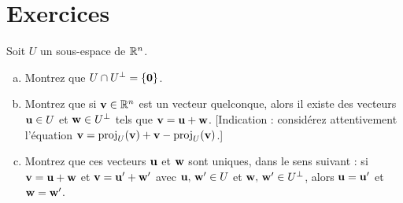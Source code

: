 \section*{Exercices}
 

\begin{prob} \label{prob20.1} Soit $U$ un sous-espace de $\mathbb{R}^n$.
\medskip

\begin{enumerate}[a)]
\item  Montrez que $U \cap U^\perp = \{\mathbf{0}\}$.
\medskip
 
\item  Montrez que si $\mathbf{v}\in \mathbb{R}^n$ est un vecteur quelconque, alors il existe des vecteurs $\mathbf{u}\in U$ et $\mathbf{w}\in U^\perp$ tels que $\mathbf{v}=\mathbf{u}+\mathbf{w}$. [Indication : consid\'erez attentivement l'équation $\mathbf{v}= \operatorname{proj}_U(\mathbf{v}) + \mathbf{v}-\operatorname{proj}_U(\mathbf{v})$.]
\medskip
 
\item Montrez que ces vecteurs $\mathbf{u}$ et $\mathbf{w}$ sont uniques, dans le sens suivant : si $\mathbf{v}=\mathbf{u}+\mathbf{w}$ et $\mathbf{v}=\mathbf{u}'+\mathbf{w}'$ avec $\mathbf{u},\, \mathbf{w}'\in U$ et $\mathbf{w},\, \mathbf{w}'\in U^\perp$, alors $\mathbf{u}=\mathbf{u}'$ et $\mathbf{w}=\mathbf{w}'$.
\medskip
 
\end{enumerate}

\end{prob} 

 